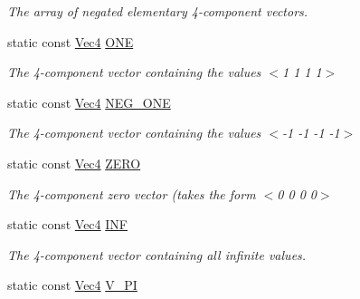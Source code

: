 \begin{DoxyCompactItemize}
\begin{DoxyCompactList}\small\item\em The array of negated elementary 4-\/component vectors. \end{DoxyCompactList}\item 
\hypertarget{classgfxmath_1_1_vec4_a8d96edc291bfe9bca2c3be29a8854540}{}static const \hyperlink{classgfxmath_1_1_vec4}{Vec4} \hyperlink{classgfxmath_1_1_vec4_a8d96edc291bfe9bca2c3be29a8854540}{O\+N\+E}\label{classgfxmath_1_1_vec4_a8d96edc291bfe9bca2c3be29a8854540}

\begin{DoxyCompactList}\small\item\em The 4-\/component vector containing the values $<$1 1 1 1$>$ \end{DoxyCompactList}\item 
\hypertarget{classgfxmath_1_1_vec4_ae4be75273eed9c0f9182ef17bac0e8df}{}static const \hyperlink{classgfxmath_1_1_vec4}{Vec4} \hyperlink{classgfxmath_1_1_vec4_ae4be75273eed9c0f9182ef17bac0e8df}{N\+E\+G\+\_\+\+O\+N\+E}\label{classgfxmath_1_1_vec4_ae4be75273eed9c0f9182ef17bac0e8df}

\begin{DoxyCompactList}\small\item\em The 4-\/component vector containing the values $<$-\/1 -\/1 -\/1 -\/1$>$ \end{DoxyCompactList}\item 
\hypertarget{classgfxmath_1_1_vec4_a0e333321044266f7ae4ae206a46a0036}{}static const \hyperlink{classgfxmath_1_1_vec4}{Vec4} \hyperlink{classgfxmath_1_1_vec4_a0e333321044266f7ae4ae206a46a0036}{Z\+E\+R\+O}\label{classgfxmath_1_1_vec4_a0e333321044266f7ae4ae206a46a0036}

\begin{DoxyCompactList}\small\item\em The 4-\/component zero vector (takes the form $<$0 0 0 0$>$ \end{DoxyCompactList}\item 
static const \hyperlink{classgfxmath_1_1_vec4}{Vec4} \hyperlink{classgfxmath_1_1_vec4_a38e1933d9d6d5dd565a424a0a049f92e}{I\+N\+F}
\begin{DoxyCompactList}\small\item\em The 4-\/component vector containing all infinite values. \end{DoxyCompactList}\item 
\hypertarget{classgfxmath_1_1_vec4_a701ee797c358e77caf14668721acf721}{}static const \hyperlink{classgfxmath_1_1_vec4}{Vec4} \hyperlink{classgfxmath_1_1_vec4_a701ee797c358e77caf14668721acf721}{V\+\_\+\+P\+I}\label{classgfxmath_1_1_vec4_a701ee797c358e77caf14668721acf721}


\end{DoxyCompactItemize}
